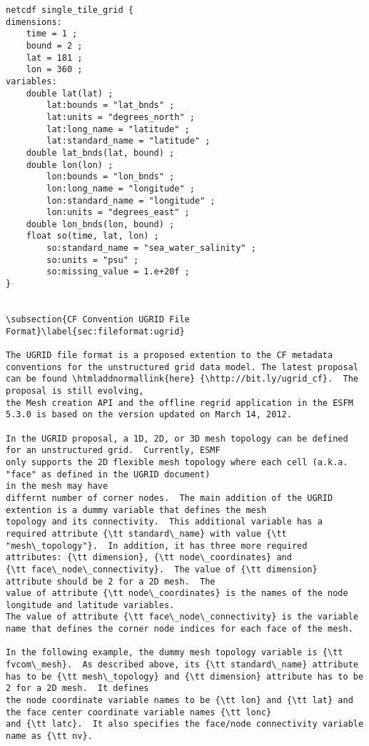 \begin{verbatim}
netcdf single_tile_grid {
dimensions:
	time = 1 ;
	bound = 2 ;
	lat = 181 ;
	lon = 360 ;
variables:
	double lat(lat) ;
		lat:bounds = "lat_bnds" ;
		lat:units = "degrees_north" ;
		lat:long_name = "latitude" ;
		lat:standard_name = "latitude" ;
	double lat_bnds(lat, bound) ;
	double lon(lon) ;
		lon:bounds = "lon_bnds" ;
		lon:long_name = "longitude" ;
		lon:standard_name = "longitude" ;
		lon:units = "degrees_east" ;
	double lon_bnds(lon, bound) ;
	float so(time, lat, lon) ;
		so:standard_name = "sea_water_salinity" ;
		so:units = "psu" ;
		so:missing_value = 1.e+20f ;
}


\subsection{CF Convention UGRID File Format}\label{sec:fileformat:ugrid}

The UGRID file format is a proposed extention to the CF metadata conventions for the unstructured grid data model. The latest proposal can be found \htmladdnormallink{here} {\http://bit.ly/ugrid_cf}.  The proposal is still evolving, 
the Mesh creation API and the offline regrid application in the ESFM 5.3.0 is based on the version updated on March 14, 2012.

In the UGRID proposal, a 1D, 2D, or 3D mesh topology can be defined for an unstructured grid.  Currently, ESMF 
only supports the 2D flexible mesh topology where each cell (a.k.a. "face" as defined in the UGRID document)  
in the mesh may have 
differnt number of corner nodes.  The main addition of the UGRID extention is a dummy variable that defines the mesh 
topology and its connectivity.  This additional variable has a required attribute {\tt standard\_name} with value {\tt "mesh\_topology"}.  In addition, it has three more required attributes: {\tt dimension}, {\tt node\_coordinates} and 
{\tt face\_node\_connectivity}.  The value of {\tt dimension} attribute should be 2 for a 2D mesh.  The 
value of attribute {\tt node\_coordinates} is the names of the node longitude and latitude variables.
The value of attribute {\tt face\_node\_connectivity} is the variable name that defines the corner node indices for each face of the mesh.   

In the following example, the dummy mesh topology variable is {\tt fvcom\_mesh}.  As described above, its {\tt standard\_name} attribute has to be {\tt mesh\_topology} and {\tt dimension} attribute has to be 2 for a 2D mesh.  It defines 
the node coordinate variable names to be {\tt lon} and {\tt lat} and the face center coordinate variable names {\tt lonc} 
and {\tt latc}.  It also specifies the face/node connectivity variable name as {\tt nv}.


\end{verbatim}
